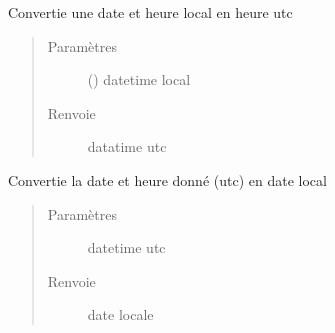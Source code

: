 \documentclass[letterpaper,10pt,french]{sphinxmanual}
\begin{document}
\begin{fulllineitems}
\label{\detokenize{modules/dtemng:toolbox.dtemng.datetime_from_local_to_utc}}
Convertie une date et heure local en heure utc
\begin{quote}\begin{description}
\item[{Paramètres}] \leavevmode
{} () \textendash{} datetime local

\item[{Renvoie}] \leavevmode
datatime utc

\end{description}\end{quote}

\end{fulllineitems}


\begin{fulllineitems}
\label{\detokenize{modules/dtemng:toolbox.dtemng.datetime_from_utc_to_local}}
Convertie la date et heure donné (utc) en date local
\begin{quote}\begin{description}
\item[{Paramètres}] \leavevmode
{} \textendash{} datetime utc

\item[{Renvoie}] \leavevmode
date locale

\end{description}\end{quote}

\end{fulllineitems}

\end{document}
